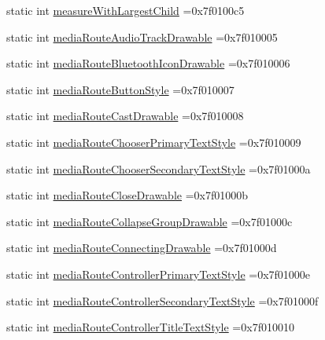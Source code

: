 \begin{DoxyCompactItemize}
static int \hyperlink{classandroid_1_1support_1_1v7_1_1mediarouter_1_1R_1_1attr_a899ba0652d7456262ca0278dcd856b28}{measure\+With\+Largest\+Child} =0x7f0100c5
\item 
static int \hyperlink{classandroid_1_1support_1_1v7_1_1mediarouter_1_1R_1_1attr_a45bbd2aa62503aa1460bf68357fc3377}{media\+Route\+Audio\+Track\+Drawable} =0x7f010005
\item 
static int \hyperlink{classandroid_1_1support_1_1v7_1_1mediarouter_1_1R_1_1attr_ad202920b84b31694684d79257bd7936b}{media\+Route\+Bluetooth\+Icon\+Drawable} =0x7f010006
\item 
static int \hyperlink{classandroid_1_1support_1_1v7_1_1mediarouter_1_1R_1_1attr_a890cab55c821c0c023da2e86f56103b4}{media\+Route\+Button\+Style} =0x7f010007
\item 
static int \hyperlink{classandroid_1_1support_1_1v7_1_1mediarouter_1_1R_1_1attr_af2b44d4c8887f246b370eadabf3cc633}{media\+Route\+Cast\+Drawable} =0x7f010008
\item 
static int \hyperlink{classandroid_1_1support_1_1v7_1_1mediarouter_1_1R_1_1attr_ab9227701c8a8e28be24ed26468b8ea70}{media\+Route\+Chooser\+Primary\+Text\+Style} =0x7f010009
\item 
static int \hyperlink{classandroid_1_1support_1_1v7_1_1mediarouter_1_1R_1_1attr_aa03144d339e5025c283ee921787f6b96}{media\+Route\+Chooser\+Secondary\+Text\+Style} =0x7f01000a
\item 
static int \hyperlink{classandroid_1_1support_1_1v7_1_1mediarouter_1_1R_1_1attr_a1fda60d3a9805d0fbb3af5cb00f1844e}{media\+Route\+Close\+Drawable} =0x7f01000b
\item 
static int \hyperlink{classandroid_1_1support_1_1v7_1_1mediarouter_1_1R_1_1attr_ad722747bd81d3d38503fa673a1b12b37}{media\+Route\+Collapse\+Group\+Drawable} =0x7f01000c
\item 
static int \hyperlink{classandroid_1_1support_1_1v7_1_1mediarouter_1_1R_1_1attr_a03f2169b892ffbc9c6fc2b36ed3299eb}{media\+Route\+Connecting\+Drawable} =0x7f01000d
\item 
static int \hyperlink{classandroid_1_1support_1_1v7_1_1mediarouter_1_1R_1_1attr_a1b5a4058dc693666c8842c27a4aed959}{media\+Route\+Controller\+Primary\+Text\+Style} =0x7f01000e
\item 
static int \hyperlink{classandroid_1_1support_1_1v7_1_1mediarouter_1_1R_1_1attr_a778907efbdfcdaa7b7d8dcb77d1fd60b}{media\+Route\+Controller\+Secondary\+Text\+Style} =0x7f01000f
\item 
static int \hyperlink{classandroid_1_1support_1_1v7_1_1mediarouter_1_1R_1_1attr_a52836cfe4d915546fc267678f77ab5d1}{media\+Route\+Controller\+Title\+Text\+Style} =0x7f010010

\end{DoxyCompactItemize}
